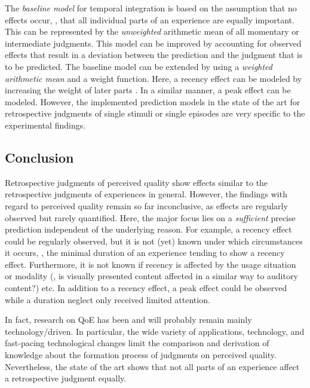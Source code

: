 The \emph{baseline model} for temporal integration is based on the assumption that no effects occur, \ie, that all individual parts of an experience are equally important.
This can be represented by the \emph{unweighted} arithmetic mean of all momentary or intermediate judgments.
This model can be improved by accounting for observed effects that result in a deviation between the prediction and the judgment that is to be predicted.
The baseline model can be extended by using a \emph{weighted arithmetic mean} and a weight function.
Here, a recency effect can be modeled by increasing the weight of later parts \citep[][]{rosenbluth_testing_1998, weiss_modeling_2009, hamberg_time-varying_1999}.
In a similar manner, a peak effect can be modeled.
However, the implemented prediction models in the state of the art for retrospective judgments of single stimuli or single episodes are very specific to the experimental findings.

\subsection{Conclusion}
Retrospective judgments of perceived quality show effects similar to the retrospective judgments of experiences in general.
However, the findings with regard to perceived quality remain so far inconclusive, as effects are regularly observed but rarely quantified.
Here, the major focus lies on a \emph{sufficient} precise prediction independent of the underlying reason.
For example, a recency effect could be regularly observed, but it is not (yet) known under which circumstances it occurs, \eg, the minimal duration of an experience tending to show a recency effect.
Furthermore, it is not known if recency is affected by the usage situation or modality (\eg, is visually presented content affected in a similar way to auditory content?) etc.
In addition to a recency effect, a peak effect could be observed while a duration neglect only received limited attention.

In fact, research on \ac{QoE} has been and will probably remain mainly technology\-/driven.
In particular, the wide variety of applications, technology, and fast-pacing technological changes limit the comparison and derivation of knowledge about the formation process of judgments on perceived quality.
Nevertheless, the state of the art shows that not all parts of an experience affect a retrospective judgment equally.
